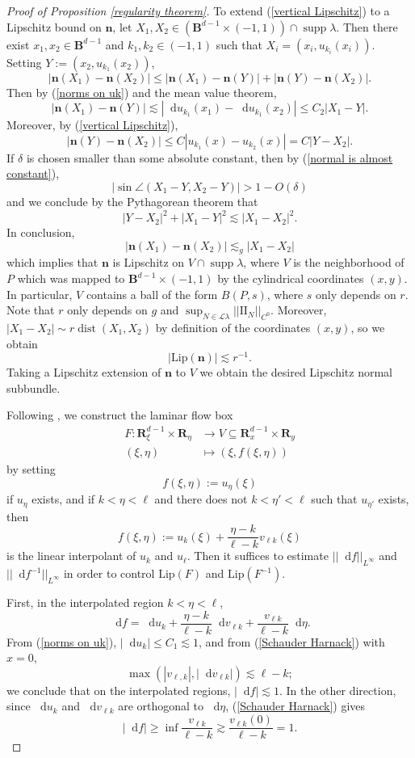 \documentclass[reqno,11pt]{amsart}
\newcommand{\RR}{\mathbf{R}}
\newcommand{\Ball}{\mathbf{B}}
\newcommand*\dif{\mathop{}\!\mathrm{d}}
\DeclareMathOperator{\dist}{dist}
\DeclareMathOperator{\supp}{supp}
\newcommand{\Leaves}{\mathscr L}
\newcommand{\Two}{\mathrm{I\!I}}
\newcommand{\normal}{\mathbf n}
\newcommand{\Lip}{\mathrm{Lip}}
\theoremstyle{definition}
\numberwithin{equation}{section}
\begin{document}
\begin{proof}[Proof of Proposition \ref{regularity theorem}]
To extend (\ref{vertical Lipschitz}) to a Lipschitz bound on $\normal$, let $X_1, X_2 \in (\Ball^{d - 1} \times (-1, 1)) \cap \supp \lambda$.
Then there exist $x_1, x_2 \in \Ball^{d - 1}$ and $k_1, k_2 \in (-1, 1)$ such that $X_i = (x_i, u_{k_i}(x_i))$.
Setting $Y := (x_2, u_{k_1}(x_2))$,
$$|\normal(X_1) - \normal(X_2)| \leq |\normal(X_1) - \normal(Y)| + |\normal(Y) - \normal(X_2)|.$$
Then by (\ref{norms on uk}) and the mean value theorem,
$$|\normal(X_1) - \normal(Y)| \lesssim |\dif u_{k_1}(x_1) - \dif u_{k_1}(x_2)| \leq C_2 |X_1 - Y|.$$
Moreover, by (\ref{vertical Lipschitz}),
$$|\normal(Y) - \normal(X_2)| \leq C|u_{k_1}(x) - u_{k_2}(x)| = C|Y - X_2|.$$
If $\delta$ is chosen smaller than some absolute constant, then by (\ref{normal is almost constant}),
$$|\sin \angle(X_1 - Y, X_2 - Y)| > 1 - O(\delta)$$
and we conclude by the Pythagorean theorem that
$$|Y - X_2|^2 + |X_1 - Y|^2 \lesssim |X_1 - X_2|^2.$$
In conclusion,
$$|\normal(X_1) - \normal(X_2)| \lesssim_g |X_1 - X_2|$$
which implies that $\normal$ is Lipschitz on $V \cap \supp \lambda$, where $V$ is the neighborhood of $P$ which was mapped to $\Ball^{d - 1} \times (-1, 1)$ by the cylindrical coordinates $(x, y)$.
In particular, $V$ contains a ball of the form $B(P, s)$, where $s$ only depends on $r$.
Note that $r$ only depends on $g$ and $\sup_{N \in \Leaves \lambda} ||\Two_N||_{C^0}$.
Moreover, $|X_1 - X_2| \sim r \dist(X_1, X_2)$ by definition of the coordinates $(x, y)$, so we obtain
\begin{equation}\label{lipschitz normal}
	|\Lip(\normal)| \lesssim r^{-1}.
\end{equation}
Taking a Lipschitz extension of $\normal$ to $V$ we obtain the desired Lipschitz normal subbundle.

Following \cite[Appendix B]{ColdingMinicozziIV}, we construct the laminar flow box
\begin{align*}
	F: \RR^{d - 1}_\xi \times \RR_\eta &\to V \subseteq \RR^{d - 1}_x \times \RR_y \\
	(\xi, \eta) &\mapsto (\xi, f(\xi, \eta))
\end{align*}
by setting
$$f(\xi, \eta) := u_\eta(\xi)$$
if $u_\eta$ exists, and if $k < \eta < \ell$ and there does not $k < \eta' < \ell$ such that $u_{\eta'}$ exists, then
$$f(\xi, \eta) := u_k(\xi) + \frac{\eta - k}{\ell - k} v_{\ell k}(\xi)$$
is the linear interpolant of $u_k$ and $u_\ell$.
Then it suffices to estimate $||\dif f||_{L^\infty}$ and $||\dif f^{-1}||_{L^\infty}$ in order to control $\Lip(F)$ and $\Lip(F^{-1})$.

First, in the interpolated region $k < \eta < \ell$,
$$\dif f = \dif u_k + \frac{\eta - k}{\ell - k} \dif v_{\ell k} + \frac{v_{\ell k}}{\ell - k} \dif \eta.$$
From (\ref{norms on uk}), $|\dif u_k| \leq C_1 \lesssim 1$, and from (\ref{Schauder Harnack}) with $x = 0$,
$$\max(|v_{\ell, k}|, |\dif v_{\ell k}|) \lesssim \ell - k;$$
we conclude that on the interpolated regions, $|\dif f| \lesssim 1$.
In the other direction, since $\dif u_k$ and $\dif v_{\ell k}$ are orthogonal to $\dif \eta$, (\ref{Schauder Harnack}) gives
$$|\dif f| \geq \inf \frac{v_{\ell k}}{\ell - k} \gtrsim \frac{v_{\ell k}(0)}{\ell - k} = 1.$$


\end{proof}
\end{document}
